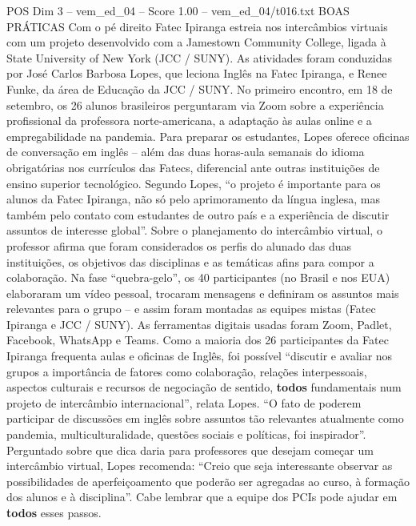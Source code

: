 \begin{textsample}{POS Dim 3 – vem\_ed\_04 – Score 1.00 – vem\_ed\_04/t016.txt}  \label{ex:f3_pos_091}
BOAS PRÁTICAS Com o pé direito Fatec Ipiranga estreia nos intercâmbios virtuais com um projeto desenvolvido com a Jamestown Community College, ligada à State University of New York (JCC / SUNY).
As atividades foram conduzidas por José Carlos Barbosa Lopes, que leciona Inglês na Fatec Ipiranga, e Renee Funke, da área de Educação da JCC / SUNY.
No primeiro encontro, em 18 de setembro, os 26 alunos brasileiros perguntaram via Zoom sobre a experiência profissional da professora norte-americana, a adaptação às aulas online e a empregabilidade na pandemia.
Para preparar os estudantes, Lopes oferece oficinas de conversação em inglês – além das duas horas-aula semanais do idioma obrigatórias nos currículos das Fatecs, diferencial ante outras instituições de ensino superior tecnológico.
Segundo Lopes, “o projeto é importante para os alunos da Fatec Ipiranga, não só pelo aprimoramento da língua inglesa, mas também pelo contato com estudantes de outro país e a experiência de discutir assuntos de interesse global”.
Sobre o planejamento do intercâmbio virtual, o professor afirma que foram considerados os perfis do alunado das duas instituições, os objetivos das disciplinas e as temáticas afins para compor a colaboração.
Na fase “quebra-gelo”, os 40 participantes (no Brasil e nos EUA) elaboraram um vídeo pessoal, trocaram mensagens e definiram os assuntos mais relevantes para o grupo – e assim foram montadas as equipes mistas (Fatec Ipiranga e JCC / SUNY).
As ferramentas digitais usadas foram Zoom, Padlet, Facebook, WhatsApp e Teams.
Como a maioria dos 26 participantes da Fatec Ipiranga frequenta aulas e oficinas de Inglês, foi possível “discutir e avaliar nos grupos a importância de fatores como colaboração, relações interpessoais, aspectos culturais e recursos de negociação de sentido, \textbf{todos} fundamentais num projeto de intercâmbio internacional”, relata Lopes. “O fato de poderem participar de discussões em inglês sobre assuntos tão relevantes atualmente como pandemia, multiculturalidade, questões sociais e políticas, foi inspirador”.
Perguntado sobre que dica daria para professores que desejam começar um intercâmbio virtual, Lopes recomenda: “Creio que seja interessante observar as possibilidades de aperfeiçoamento que poderão ser agregadas ao curso, à formação dos alunos e à disciplina”.
Cabe lembrar que a equipe dos PCIs pode ajudar em \textbf{todos} esses passos.

\end{textsample}
